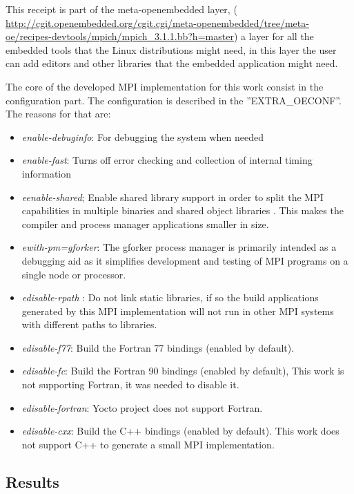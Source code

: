 \newpage

This receipt is part of the meta-openembedded layer, (
\url{http://cgit.openembedded.org/cgit.cgi/meta-openembedded/tree/meta-oe/recipes-devtools/mpich/mpich_3.1.1.bb?h=master})
a layer for all the embedded tools that the Linux distributions might need, in this
layer the user can add editors and other libraries that the embedded
application might need.

The core of the developed MPI implementation for this work consist in the
configuration part. The configuration is described in the ''EXTRA\_OECONF''. 
The reasons for that are: 

\begin{itemize}
\item \textit{enable-debuginfo}: For debugging the system when needed
\item \textit{enable-fast}: Turns off error checking and collection of internal timing
information
\item \textit{eenable-shared}; Enable shared library support in order to split the MPI
capabilities in multiple binaries and shared object libraries . This makes the
compiler and process manager applications smaller in size.
\item \textit{ewith-pm=gforker}: The gforker process manager is primarily intended as a
debugging aid as it simplifies development and testing of MPI programs on a
single node or processor.
\item \textit{edisable-rpath} : Do not link static libraries, if so the build
applications generated by this MPI implementation will not run in other MPI
systems with different paths to libraries.
\item \textit{edisable-f77}: Build the Fortran 77 bindings (enabled by default).
\item \textit{edisable-fc}: Build the Fortran 90 bindings (enabled by default),
This work is not supporting Fortran, it was needed to disable it.
\item \textit{edisable-fortran}: Yocto project does not support Fortran.
\item \textit{edisable-cxx}: Build the C++ bindings (enabled by default). This
work does not support C++ to generate a small MPI implementation.
\end{itemize}


\subsection{Results}

